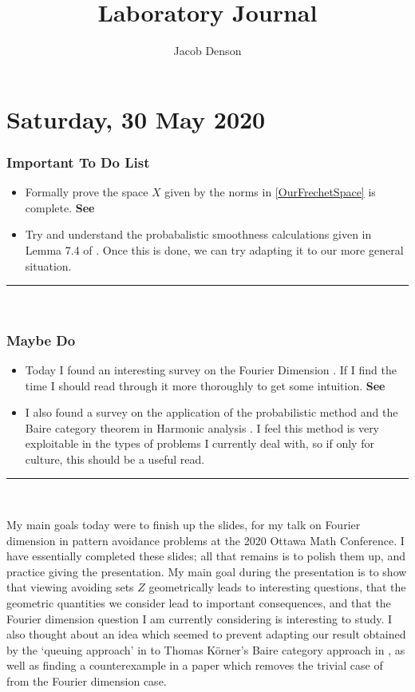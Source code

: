 \documentclass[openany,nobib,nols,a4paper,twoside,symmetric,justified,notoc]{tufte-book}
\title{Laboratory Journal}
\author{Jacob Denson}
\theoremstyle{plain}
\theoremstyle{remark}
\theoremstyle{definition}
\newenvironment{importanttodo}%
    {\subsection{Important To Do List}}%
    {\vspace{2mm}\hrule\hspace{\stretch{1}}\\}
\newenvironment{maybedo}%
    {\subsection{Maybe Do}}%
    {\vspace{2mm}\hrule\hspace{\stretch{1}}\\}
\begin{document}
\maketitle
\tableofcontents
\newpage










\chapter{Saturday, 30 May 2020} \label{30052020}

\begin{importanttodo}
\begin{itemize}
    \item Formally prove the space $X$ given by the norms in \eqref{OurFrechetSpace} is complete. \textbf{See }

    \item Try and understand the probabalistic smoothness calculations given in Lemma 7.4 of \cite{Korner2009}. Once this is done, we can try adapting it to our more general situation.
\end{itemize}
\end{importanttodo}

\begin{maybedo}
\begin{itemize}
    \item Today I found an interesting survey on the Fourier Dimension \cite{Ekstrom2017}. If I find the time I should read through it more thoroughly to get some intuition. \textbf{See }

    \item I also found a survey on the application of the probabilistic method and the Baire category theorem in Harmonic analysis \cite{Kahane2000}. I feel this method is very exploitable in the types of problems I currently deal with, so if only for culture, this should be a useful read.
\end{itemize}
\end{maybedo}

My main goals today were to finish up the slides, for my talk on Fourier dimension in pattern avoidance problems at the 2020 Ottawa Math Conference. I have essentially completed these slides; all that remains is to polish them up, and practice giving the presentation. My main goal during the presentation is to show that viewing avoiding sets $Z$ geometrically leads to interesting questions, that the geometric quantities we consider lead to important consequences, and that the Fourier dimension question I am currently considering is interesting to study. I also thought about an idea which seemed to prevent adapting our result obtained by the `queuing approach' in \cite{Denson2019} to Thomas K\"{o}rner's Baire category approach in \cite{Korner2009}, as well as finding a counterexample in a paper which removes the trivial case of \cite{Denson2019} from the Fourier dimension case.
\end{document}

